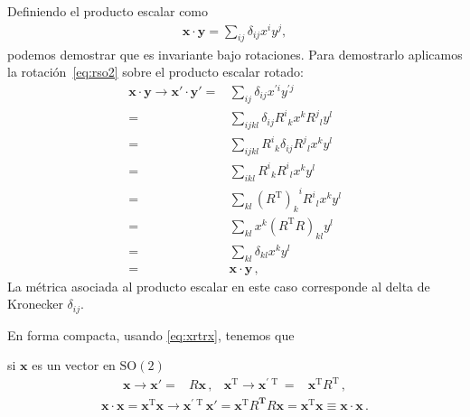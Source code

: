 Definiendo el producto escalar como
\begin{align}
  \boldsymbol{x}\cdot \boldsymbol{y}=\sum_{ij}\delta_{ij} x^i y^j,
\end{align}
podemos demostrar que es invariante bajo rotaciones. Para demostrarlo aplicamos la rotación~\eqref{eq:rso2} sobre el producto escalar rotado:
\begin{align}
  \boldsymbol{x}\cdot \boldsymbol{y}\to  \boldsymbol{x}'\cdot \boldsymbol{y}'
                     =&\sum_{ij} \delta_{ij} x^{\prime i}  y^{\prime j} \nonumber\\
                     =&\sum_{ijkl}\delta_{ij} {R^i}_k x^{k}  {R^j}_l y^{l} \nonumber\\
                     =&\sum_{ijkl} {R^i}_k \delta_{ij} {R^j}_l  x^{k}  y^{l} \nonumber\\
  =&\sum_{ikl} {R^i}_k  {R^i}_l  x^{k}  y^{l} \nonumber\\
  \label{eq:xrtrx}
                     =&\sum_{kl}  {\left( R^{\text{T}} \right)_k}^i  {R^i}_l  x^{k}  y^{l} \\
  =&\sum_{kl} x^{k}  \left( R^{\text{T}}R \right)_{kl}      y^{l} \nonumber\\
  =&\sum_{kl}  \delta_{kl}    x^{k}  y^{l} \nonumber\\
    =& \boldsymbol{x}\cdot \boldsymbol{y}\,,
\end{align}
La métrica asociada al producto escalar en este caso corresponde al delta de Kronecker $\delta_{ij}$.

En forma compacta, usando \eqref{eq:xrtrx}, tenemos que
\begin{frame}
  si $\boldsymbol{x}$ es un vector en $\operatorname{SO(2)}$
\begin{align}
  \boldsymbol{x}\to \boldsymbol{x}'=&R \boldsymbol{x}\,,&
  \boldsymbol{x}^{\operatorname{T}}\to \boldsymbol{x}^{\prime {\operatorname{T}}}=& \boldsymbol{x}^{\operatorname{T}} R^{\operatorname{T}}\,,
\end{align}
\begin{align}
  \label{eq:psso2}
  \boldsymbol{x}\cdot \boldsymbol{x}= \boldsymbol{x}^{\operatorname{T}} \boldsymbol{x}\to \boldsymbol{x}^{\prime\operatorname{T}} \boldsymbol{x}'
  =\boldsymbol{x}^{\operatorname{T}}R^{\boldsymbol{T}} R \boldsymbol{x}=\boldsymbol{x}^{\operatorname{T}} \boldsymbol{x}\equiv  \boldsymbol{x}\cdot \boldsymbol{x}\,.
\end{align}

\end{frame}

